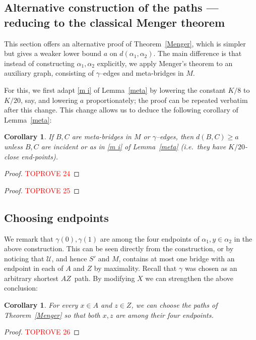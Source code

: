 \documentclass[a4paper]{article}
\newtheorem{corollary}[proposition]{Corollary}
\newcommand{\cu}{\ensuremath{\mathcal U}}
\newcommand{\pth}[2]{\ensuremath{#1}\text{--}\ensuremath{#2}~path}
\newcommand{\Lr}[1]{Lemma~\ref{#1}}
\newcommand{\Tr}[1]{Theorem~\ref{#1}}
\newcommand{\mb}{meta-bridge}
\newcommand{\game}{$\gamma$--edge}
\begin{document}
\subsection{Alternative construction of the paths --- reducing to the classical Menger theorem}

This section offers an alternative proof of \Tr{Menger}, which is simpler but gives a weaker lower bound $a$ on $d(\alpha_1,\alpha_2)$. The main difference is that instead of constructing $\alpha_1,\alpha_2$ explicitly, we apply Menger's theorem to an auxiliary graph, consisting of \game s and \mb s in $M$.

For this, we first adapt \ref{m i} of \Lr{meta} by lowering the constant $K/8$ to $K/20$, say, and lowering $a$ proportionately; the proof can be repeated verbatim after this change. This change allows us to deduce the following corollary of \Lr{meta}: 
\begin{corollary} \label{cor meta}
If $B,C$ are \mb s in $M$ or \game s, then $d(B,C)\geq a$ unless $B,C$ are incident or as in \ref{m i} of \Lr{meta} (i.e.\ they have $K/20$-close end-points).
\end{corollary}
\begin{proof}\textcolor{red}{TOPROVE 24}\end{proof}

\begin{proof}\textcolor{red}{TOPROVE 25}\end{proof}



\subsection{Choosing endpoints}
We remark that $\gamma(0),\gamma(1)$ are among the four endpoints of $\alpha_1, y\in \alpha _2$ in the above construction. This can be seen directly from the construction, or by noticing that $\cu$, and hence $S'$ and $M$, contains at most one bridge with an endpoint in each of $A$ and $Z$ by maximality. Recall that $\gamma$ was chosen as an arbitrary shortest \pth{A}{Z}. By modifying $X$ we can strengthen the above conclusion:

\begin{corollary} \label{endpoints}
For every $x\in A$ and $z\in Z$, we can choose the paths of \Tr{Menger} so that both $x,z$ are among their four endpoints.
\end{corollary}
\begin{proof}\textcolor{red}{TOPROVE 26}\end{proof}
\end{document}
